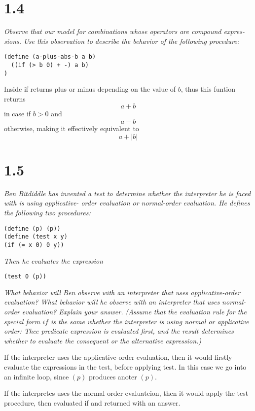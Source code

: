 \documentclass[11pt,oneside,titlepage]{book}
\begin{document}
\section*{1.4}

\textit{Observe that our model for combinations whose operators are compound expres-
sions. Use this observation to describe the behavior of the
following procedure:}

\begin{verbatim}
(define (a-plus-abs-b a b)
  ((if (> b 0) + -) a b)
)
\end{verbatim}

Inside if returns plus or minus depending on the value of $b$, thus this funtion returns
$$a + b$$
in case if $b > 0$
and
$$a - b$$
otherwise, making it effectively equivalent to
$$a + |b|$$

\section*{1.5}
\textit{ Ben Bitdiddle has invented a test to determine
whether the interpreter he is faced with is using applicative-
order evaluation or normal-order evaluation. He defines the
following two procedures:}
\begin{verbatim}
(define (p) (p))
(define (test x y)
(if (= x 0) 0 y))
\end{verbatim}
\textit{Then he evaluates the expression}
\begin{verbatim}
(test 0 (p))
\end{verbatim}
\textit{What behavior will Ben observe with an interpreter that
uses applicative-order evaluation? What behavior will he
observe with an interpreter that uses normal-order evaluation?
Explain your answer. (Assume that the evaluation
rule for the special form $if$ is the same whether the interpreter
is using normal or applicative order: Thee predicate
expression is evaluated first, and the result determines
whether to evaluate the consequent or the alternative expression.)
}

If the interpreter uses the applicative-order evaluation, then it would
firstly evaluate the expressions in the test, before applying test. In this case
we go into an infinite loop, since $(p)$ produces anoter $(p)$.

If the interpretes uses the normal-order evaluateion, then it would apply
the test procedure, then evaluated if and returned with an answer.
\end{document}
